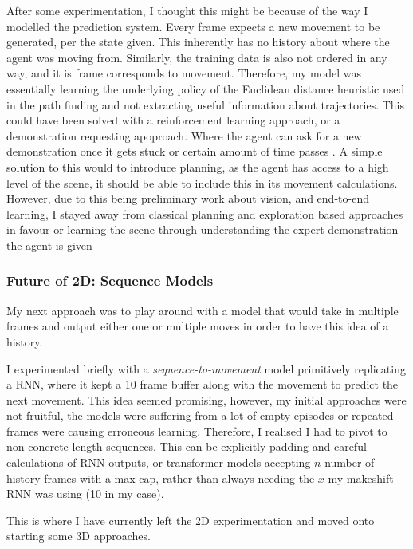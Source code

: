 After some experimentation, I thought this might be because of the way I modelled the prediction system. Every frame expects a new movement to be generated, per the state given. This inherently has no history about where the agent was moving from. Similarly, the training data is also not ordered in any way, and it is frame corresponds to movement. Therefore, my model was essentially learning the underlying policy of the Euclidean distance heuristic used in the path finding and not extracting useful information about trajectories. This could have been solved with a reinforcement learning approach, or a demonstration requesting apoproach. Where the agent can ask for a new demonstration once it gets stuck or certain amount of time passes .
A simple solution to this would to introduce planning, as the agent has access to a high level of the scene, it should be able to include this in its movement calculations. However, due to this being preliminary work about vision, and end-to-end learning, I stayed away from classical planning and exploration based approaches in favour or learning the scene through understanding the expert demonstration the agent is given

\subsubsection{Future of 2D: Sequence Models}
My next approach was to play around with a model that would take in multiple frames and output either one or multiple moves in order to have this idea of a history.

I experimented briefly with a \emph{sequence-to-movement} model primitively replicating a RNN, where it kept a 10 frame buffer along with the movement to predict the next movement. This idea seemed promising, however, my initial approaches were not fruitful, the models were suffering from a lot of empty episodes or repeated frames were causing erroneous learning. Therefore, I realised I had to pivot to non-concrete length sequences. This can be explicitly padding and careful calculations of RNN outputs, or transformer models accepting $n$ number of history frames with a max cap, rather than always needing the $x$ my makeshift-RNN was using (10 in my case). 

This is where I have currently left the 2D experimentation and moved onto starting some 3D approaches.


